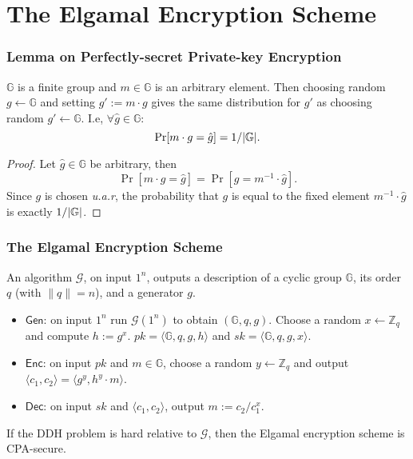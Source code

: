 \section{The Elgamal Encryption Scheme}
\begin{frame}\frametitle{Lemma on Perfectly-secret Private-key Encryption}
\begin{lemma}\label{lem:ps}
$\mathbb{G}$ is a finite group and $m\in \mathbb{G}$ is an arbitrary element. Then choosing random $g \gets \mathbb{G}$ and setting $g' := m\cdot g$ gives the same distribution for $g'$ as choosing random $g' \gets \mathbb{G}$. I.e, $\forall \hat{g} \in \mathbb{G}$:
\[ \Pr[m\cdot g = \hat{g}] = 1/\lvert\mathbb{G}\rvert. \]
\end{lemma}
\begin{proof}
Let $\hat{g} \in \mathbb{G}$ be arbitrary, then
\[\Pr[m\cdot g = \hat{g}] = \Pr[g = m^{-1}\cdot \hat{g}]. \]
Since $g$ is chosen \emph{u.a.r}, the probability that $g$ is equal to the fixed element $m^{-1}\cdot \hat{g}$ is exactly $1/\lvert\mathbb{G}\rvert$.
\end{proof}
\end{frame}
\begin{frame}\frametitle{The Elgamal Encryption Scheme}
An algorithm $\mathcal{G}$, on input $1^n$, outputs a description of a cyclic group $\mathbb{G}$, its order $q$ (with $\|q\| = n$), and a generator $g$.
\begin{construction}
\begin{itemize}
\item $\mathsf{Gen}$: on input $1^n$ run $\mathcal{G}(1^n)$ to obtain $(\mathbb{G},q,g)$. Choose a random $x \gets \mathbb{Z}_q$ and compute $h := g^x$.  $pk = \langle \mathbb{G},q,g,h \rangle$ and $sk = \langle \mathbb{G},q,g,x \rangle$.
\item $\mathsf{Enc}$: on input $pk$ and $m \in \mathbb{G}$, choose a random $y \gets \mathbb{Z}_q$ and output $\langle c_1, c_2 \rangle = \langle g^y, h^y\cdot m\rangle$.
\item $\mathsf{Dec}$: on input $sk$ and $\langle c_1, c_2 \rangle$, output $m:=c_2/c_1^x$.
\end{itemize}
\end{construction}
\begin{theorem}
If the DDH problem is hard relative to $\mathcal{G}$, then the Elgamal encryption scheme is CPA-secure.
\end{theorem}
\end{frame}
